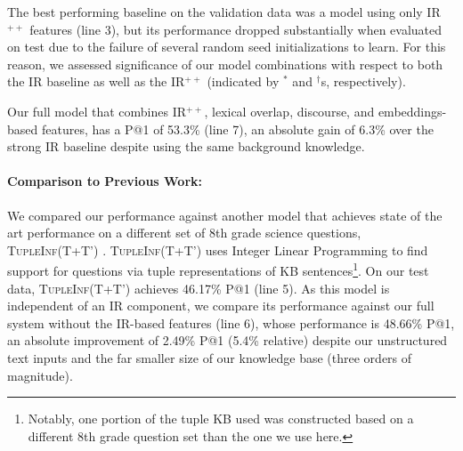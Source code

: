 The best performing baseline on the validation data was a model using only IR$^{++}$ features (line 3), but its performance dropped substantially when evaluated on test due to the failure of several random seed initializations to learn.  For this reason, we assessed significance of our model combinations with respect to both the IR baseline as well as the IR$^{++}$ (indicated by $^*$ and $^{\dagger}$s, respectively).

Our full model that combines IR$^{++}$, lexical overlap, discourse, and embeddings-based features, has a P@1 of 53.3\% (line 7), an absolute gain of 6.3\% over the strong IR baseline despite using the same background knowledge.  

\vspace{-1mm}
\paragraph{Comparison to Previous Work:}
We compared our performance against another model that achieves state of the art performance on a different set of 8th grade science questions, \textsc{TupleInf}(T+T') \citep{khot2017tupleinf}.  \textsc{TupleInf}(T+T') uses Integer Linear Programming to find support for questions via tuple representations of KB sentences\footnote{Notably, one portion of the tuple KB used was constructed based on a different 8th grade question set than the one we use here.}.
On our test data, \textsc{TupleInf}(T+T') achieves 46.17\% P@1 (line 5). 
As this model is independent of an IR component, we compare its performance against our full system without the IR-based features (line 6), whose performance is 48.66\% P@1, an absolute improvement of 2.49\% P@1 (5.4\% relative) despite our unstructured text inputs and the far smaller size of our knowledge base (three orders of magnitude). 

